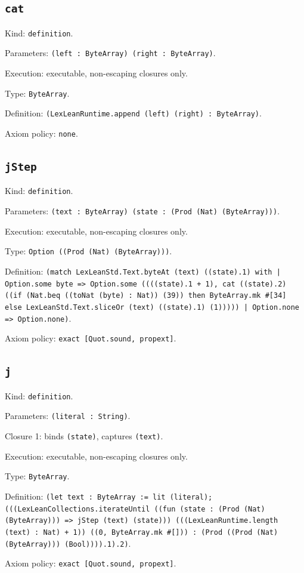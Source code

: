 \documentclass[11pt]{article}
\begin{document}
\subsection*{\texttt{cat}}
\noindent Kind: \texttt{definition}.\par
\noindent Parameters: \texttt{(left : ByteArray) (right : ByteArray)}.\par
\noindent Execution: executable, non-escaping closures only.\par
\noindent Type: \texttt{ByteArray}.\par
\noindent Definition: \texttt{(LexLeanRuntime.append (left) (right) : ByteArray)}.\par
\noindent Axiom policy: \texttt{none}.\par
\subsection*{\texttt{jStep}}
\noindent Kind: \texttt{definition}.\par
\noindent Parameters: \texttt{(text : ByteArray) (state : (Prod (Nat) (ByteArray)))}.\par
\noindent Execution: executable, non-escaping closures only.\par
\noindent Type: \texttt{Option ((Prod (Nat) (ByteArray)))}.\par
\noindent Definition: \texttt{(match LexLeanStd.Text.byteAt (text) ((state).1) with | Option.some byte => Option.some ((((state).1 + 1), cat ((state).2) ((if (Nat.beq ((toNat (byte) : Nat)) (39)) then ByteArray.mk \#[34] else LexLeanStd.Text.sliceOr (text) ((state).1) (1))))) | Option.none => Option.none)}.\par
\noindent Axiom policy: \texttt{exact [Quot.sound, propext]}.\par
\subsection*{\texttt{j}}
\noindent Kind: \texttt{definition}.\par
\noindent Parameters: \texttt{(literal : String)}.\par
\noindent Closure 1: binds \texttt{(state)}, captures \texttt{(text)}.\par
\noindent Execution: executable, non-escaping closures only.\par
\noindent Type: \texttt{ByteArray}.\par
\noindent Definition: \texttt{(let text : ByteArray := lit (literal); (((LexLeanCollections.iterateUntil ((fun (state : (Prod (Nat) (ByteArray))) => jStep (text) (state))) (((LexLeanRuntime.length (text) : Nat) + 1)) ((0, ByteArray.mk \#[])) : (Prod ((Prod (Nat) (ByteArray))) (Bool)))).1).2)}.\par
\noindent Axiom policy: \texttt{exact [Quot.sound, propext]}.\par
\end{document}
